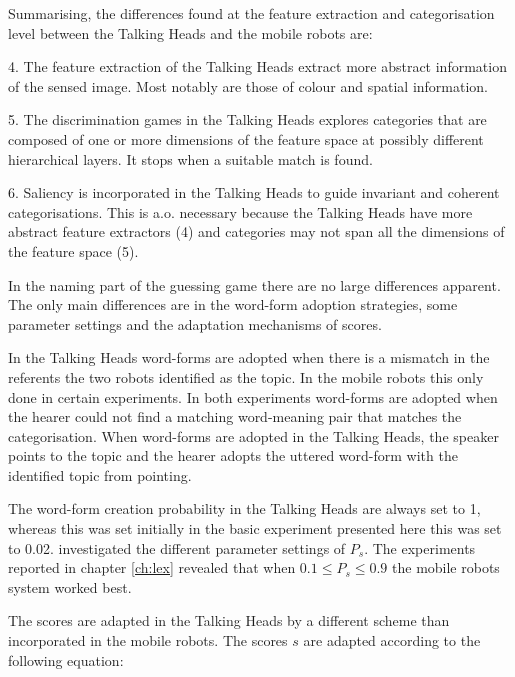 Summarising, the differences found at the feature extraction and categorisation level between the Talking Heads and the mobile robots are:

\begin{description}
\item 4. The feature extraction of the Talking Heads extract more abstract information of the sensed image. Most notably are those of colour and spatial information.
\item 5. The discrimination games in the Talking Heads explores categories that are composed of one or more dimensions of the feature space at possibly different hierarchical layers. It stops when a suitable match is found.
\item 6. Saliency is incorporated in the Talking Heads to guide invariant and coherent categorisations. This is a.o. necessary because the Talking Heads have more abstract feature extractors (4) and categories may not span all the dimensions of the feature space (5).
\end{description}

In the naming part of the guessing game there are no large differences apparent. The only main differences are in the word-form adoption strategies, some parameter settings and the adaptation mechanisms of scores.

In the Talking Heads word-forms are adopted when there is a mismatch in the referents the two robots identified as the topic. In the mobile robots this only done in certain experiments. In both experiments word-forms are adopted when the hearer could not find a matching word-meaning pair that matches the categorisation. When word-forms are adopted in the Talking Heads, the speaker points to the topic and the hearer adopts the uttered word-form with the identified topic from pointing.

The word-form creation probability in the Talking Heads are always set to 1, whereas this was set initially in the basic experiment presented here this was set to 0.02. \citet{kaplan:2000} investigated the different parameter settings of $P_s$. The experiments reported in chapter \ref{ch:lex} revealed that when $0.1 \leq P_s\leq 0.9$ the mobile robots system worked best.

The scores are adapted in the Talking Heads by a different scheme than incorporated in the mobile robots. The scores $s$ are adapted according to the following equation:

